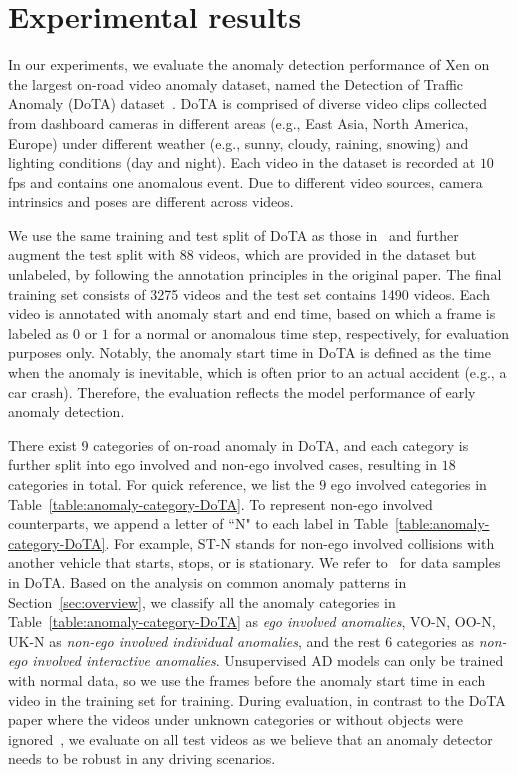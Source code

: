 \section{Experimental results}
\label{sec:experiments}

In our experiments, we evaluate the anomaly detection performance of Xen on the largest on-road video anomaly dataset, named the Detection of Traffic Anomaly (DoTA) dataset~\citep{yao2022dota}. DoTA is comprised of diverse video clips collected from dashboard cameras in different areas (e.g., East Asia, North America, Europe) under different weather (e.g., sunny, cloudy, raining, snowing) and lighting conditions (day and night). Each video in the dataset is recorded at $10$ fps and contains one anomalous event. Due to different video sources, camera intrinsics and poses are different across videos.

We use the same training and test split of DoTA as those in~\cite{yao2022dota} and further augment the test split with $88$ videos, which are provided in the dataset but unlabeled, by following the annotation principles in the original paper. The final training set consists of 3275 videos and the test set contains 1490 videos. Each video is annotated with anomaly start and end time, based on which a frame is labeled as $0$ or $1$ for a normal or anomalous time step, respectively, for evaluation purposes only. Notably, the anomaly start time in DoTA is defined as the time when the anomaly is inevitable, which is often prior to an actual accident (e.g., a car crash). Therefore, the evaluation reflects the model performance of early anomaly detection.

There exist $9$ categories of on-road anomaly in DoTA, and each category is further split into ego involved and non-ego involved cases, resulting in $18$ categories in total. For quick reference, we list the $9$ ego involved categories in Table~\ref{table:anomaly-category-DoTA}. To represent non-ego involved counterparts, we append a letter of ``N" to each label in Table~\ref{table:anomaly-category-DoTA}. For example, ST-N stands for non-ego involved collisions with another vehicle that starts, stops, or is stationary. We refer to~\cite{yao2022dota} for data samples in DoTA. Based on the analysis on common anomaly patterns in Section~\ref{sec:overview}, we classify all the anomaly categories in Table~\ref{table:anomaly-category-DoTA} as \textit{ego involved anomalies}, VO-N, OO-N, UK-N as \textit{non-ego involved individual anomalies}, and the rest $6$ categories as \textit{non-ego involved interactive anomalies}. Unsupervised AD models can only be trained with normal data, so we use the frames before the anomaly start time in each video in the training set for training. During evaluation, in contrast to the DoTA paper where the videos under unknown categories or without objects were ignored~\citep{yao2022dota}, we evaluate on all test videos as we believe that an anomaly detector needs to be robust in any driving scenarios.

